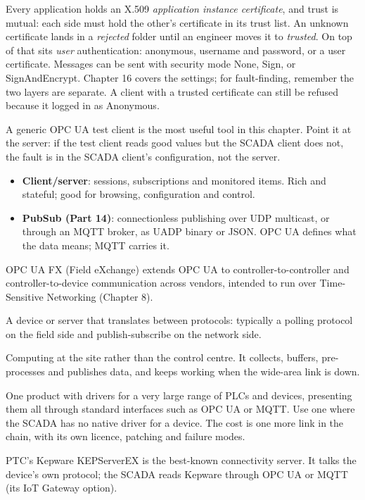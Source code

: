 Every application holds an X.509 \emph{application instance certificate}, and trust is mutual: each side must hold the other's certificate in its trust list. An unknown certificate lands in a \emph{rejected} folder until an engineer moves it to \emph{trusted}. On top of that sits \emph{user} authentication: anonymous, username and password, or a user certificate. Messages can be sent with security mode None, Sign, or SignAndEncrypt. Chapter 16 covers the settings; for fault-finding, remember the two layers are separate. A client with a trusted certificate can still be refused because it logged in as Anonymous.

\onsite A generic OPC UA test client is the most useful tool in this chapter. Point it at the server: if the test client reads good values but the SCADA client does not, the fault is in the SCADA client's configuration, not the server.

\begin{itemize}
\item \textbf{Client/server}: sessions, subscriptions and monitored items. Rich and stateful; good for browsing, configuration and control.
\item \textbf{PubSub (Part 14)}: connectionless publishing over UDP multicast, or through an MQTT broker, as UADP binary or JSON. OPC UA defines what the data means; MQTT carries it.
\end{itemize}
OPC UA FX (Field eXchange) extends OPC UA to controller-to-controller and controller-to-device communication across vendors, intended to run over Time-Sensitive Networking (Chapter 8).

 A device or server that translates between protocols: typically a polling protocol on the field side and publish-subscribe on the network side.

 Computing at the site rather than the control centre. It collects, buffers, pre-processes and publishes data, and keeps working when the wide-area link is down.

 One product with drivers for a very large range of PLCs and devices, presenting them all through standard interfaces such as OPC UA or MQTT. Use one where the SCADA has no native driver for a device. The cost is one more link in the chain, with its own licence, patching and failure modes.

 PTC's Kepware KEPServerEX is the best-known connectivity server. It talks the device's own protocol; the SCADA reads Kepware through OPC UA or MQTT (its IoT Gateway option).

